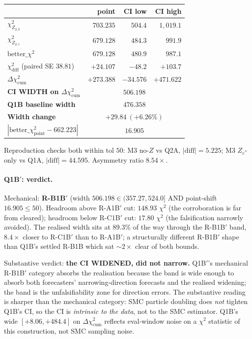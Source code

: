 \documentclass[11pt]{article}
\theoremstyle{definition}
\theoremstyle{plain}
\begin{document}
\begin{center}
\begin{tabular}{lrrr}
\toprule
& point & CI low & CI high \\
\midrule
$\chi^2_{Z_{2,b}}$                              & $703.235$ & $504.4$ & $1{,}019.1$ \\
$\chi^2_{Z_{2,c}}$                              & $679.128$ & $484.3$ & $991.9$ \\
$\mathrm{better}\_\chi^2$                       & $679.128$ & $480.9$ & $987.1$ \\
$\chi^2_{\mathrm{diff}}$ (paired SE $38.81$)    & $+24.107$ & $-48.2$ & $+103.7$ \\
$\Delta\chi^2_{\mathrm{cum}}$                   & $+273.388$ & $-34.576$ & $+471.622$ \\
\midrule
\textbf{CI WIDTH on $\Delta\chi^2_{\mathrm{cum}}$} & \multicolumn{3}{c}{$\mathbf{506.198}$} \\
\textbf{Q1B baseline width}                        & \multicolumn{3}{c}{$476.358$} \\
\textbf{Width change}                              & \multicolumn{3}{c}{$+29.84\ (+6.26\%)$} \\
$|\mathrm{better}\_\chi^2_{\mathrm{point}} - 662.223|$ & \multicolumn{3}{c}{$16.905$} \\
\bottomrule
\end{tabular}
\end{center}

Reproduction checks both within tol $50$: M3 no-$Z$ vs Q2A,
$|\mathrm{diff}| = 5.225$; M3 $Z_c$-only vs Q1A, $|\mathrm{diff}|
= 44.595$. Asymmetry ratio $8.54\times$.

\paragraph{Q1B$'$: verdict.}
Mechanical: \textbf{R-B1B$'$} (width $506.198 \in (357.27, 524.0]$
AND point-shift $16.905 \le 50$). Headroom above R-A1B$'$ cut:
$148.93$ $\chi^2$ (the corroboration is far from cleared); headroom
below R-C1B$'$ cut: $17.80$ $\chi^2$ (the falsification narrowly
avoided). The realised width sits at $89.3\%$ of the way through
the R-B1B$'$ band, $8.4\times$ closer to R-C1B$'$ than to R-A1B$'$;
a structurally different R-B1B$'$ shape than Q1B's settled R-B1B
which sat $\sim 2\times$ clear of both bounds.

Substantive verdict: \textbf{the CI WIDENED, did not narrow.}
Q1B$'$'s mechanical R-B1B$'$ category absorbs the realisation
because the band is wide enough to absorb both forecasters'
narrowing-direction forecasts and the realised widening; the band
is the unfalsifiability zone for direction errors. The substantive
reading is sharper than the mechanical category: SMC particle
doubling does \emph{not} tighten Q1B's CI, so the CI is
\emph{intrinsic to the data}, not to the SMC estimator. Q1B's wide
$[+8.06, +484.4]$ on $\Delta\chi^2_{\mathrm{cum}}$ reflects
eval-window noise on a $\chi^2$ statistic of this construction, not
SMC sampling noise.
\end{document}
